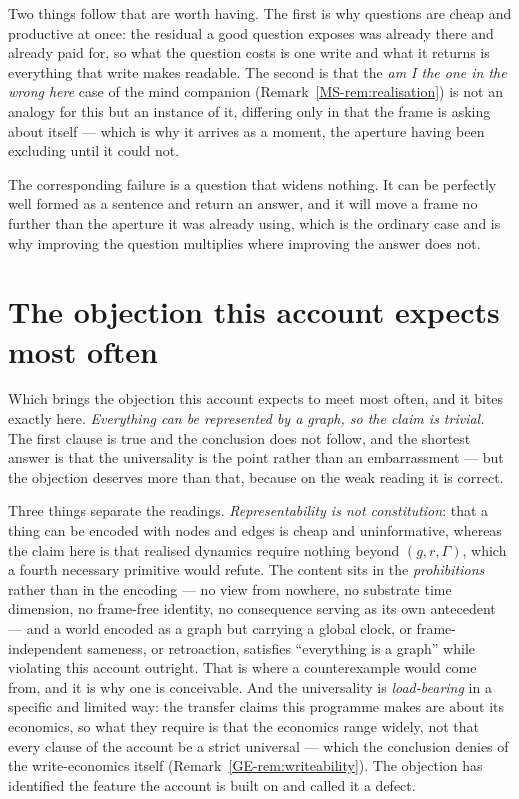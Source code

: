 \documentclass[11pt,a4paper]{article}
\begin{document}
Two things follow that are worth having. The first is why questions are cheap and productive at once:
the residual a good question exposes was already there and already paid for, so what the question costs
is one write and what it returns is everything that write makes readable. The second is that the
\emph{am I the one in the wrong here} case of the mind companion (Remark~\ref{MS-rem:realisation}) is not an analogy for this but an
instance
of it, differing only in that the frame is asking about itself --- which is why it arrives as a moment,
the aperture having been excluding until it could not.

The corresponding failure is a question that widens nothing. It can be perfectly well formed as a
sentence and return an answer, and it will move a frame no further than the aperture it was already
using, which is the ordinary case and is why improving the question multiplies where improving the
answer does not.

\section{The objection this account expects most often}\label{sec:objection}

Which brings the objection this account expects to meet most often, and it bites exactly here.
\emph{Everything can be represented by a graph, so the claim is trivial.} The first clause is true and
the conclusion does not follow, and the shortest answer is that the universality is the point rather
than an embarrassment --- but the objection deserves more than that, because on the weak reading it is
correct.

Three things separate the readings. \emph{Representability is not constitution}: that a thing can be
encoded with nodes and edges is cheap and uninformative, whereas the claim here is that realised
dynamics require nothing beyond $(g,r,\Gamma)$, which a fourth necessary primitive would refute. The
content sits in the \emph{prohibitions} rather than in the encoding --- no view from nowhere, no
substrate time dimension, no frame-free identity, no consequence serving as its own antecedent --- and a world encoded as a graph but carrying a global clock, or
frame-independent sameness, or retroaction, satisfies ``everything is a graph'' while violating this
account outright. That is where a counterexample would come from, and it is why one is conceivable.
And the universality is \emph{load-bearing} in a specific and limited way: the transfer claims this
programme makes are about its economics, so what they require is that the economics range widely, not
that every clause of the account be a strict universal --- which the conclusion denies of the
write-economics itself (Remark~\ref{GE-rem:writeability}). The objection has identified the feature the account is built on and called it a defect.
\end{document}
